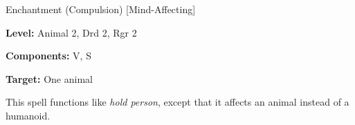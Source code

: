
Enchantment (Compulsion) [Mind-Affecting]

\textbf{Level:} Animal 2, Drd 2, Rgr 2

\textbf{Components:} V, S

\textbf{Target:} One animal

This spell functions like \textit{hold person}, except that it affects an animal 
instead of a humanoid.

